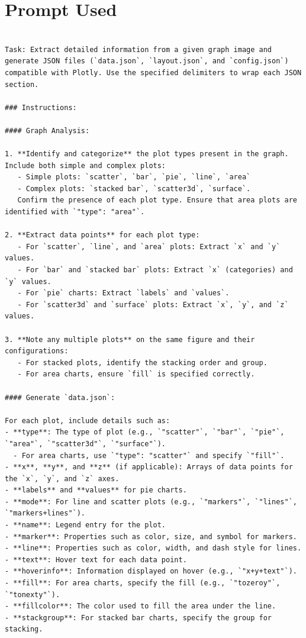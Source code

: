 \documentclass{article}
\begin{document}
\section*{Prompt Used}
\begin{verbatim}

Task: Extract detailed information from a given graph image and generate JSON files (`data.json`, `layout.json`, and `config.json`) compatible with Plotly. Use the specified delimiters to wrap each JSON section.

### Instructions:

#### Graph Analysis:

1. **Identify and categorize** the plot types present in the graph. Include both simple and complex plots:
   - Simple plots: `scatter`, `bar`, `pie`, `line`, `area`
   - Complex plots: `stacked bar`, `scatter3d`, `surface`.
   Confirm the presence of each plot type. Ensure that area plots are identified with `"type": "area"`.

2. **Extract data points** for each plot type:
   - For `scatter`, `line`, and `area` plots: Extract `x` and `y` values.
   - For `bar` and `stacked bar` plots: Extract `x` (categories) and `y` values.
   - For `pie` charts: Extract `labels` and `values`.
   - For `scatter3d` and `surface` plots: Extract `x`, `y`, and `z` values.

3. **Note any multiple plots** on the same figure and their configurations:
   - For stacked plots, identify the stacking order and group.
   - For area charts, ensure `fill` is specified correctly.

#### Generate `data.json`:

For each plot, include details such as:
- **type**: The type of plot (e.g., `"scatter"`, `"bar"`, `"pie"`, `"area"`, `"scatter3d"`, `"surface"`).
  - For area charts, use `"type": "scatter"` and specify `"fill"`.
- **x**, **y**, and **z** (if applicable): Arrays of data points for the `x`, `y`, and `z` axes.
- **labels** and **values** for pie charts.
- **mode**: For line and scatter plots (e.g., `"markers"`, `"lines"`, `"markers+lines"`).
- **name**: Legend entry for the plot.
- **marker**: Properties such as color, size, and symbol for markers.
- **line**: Properties such as color, width, and dash style for lines.
- **text**: Hover text for each data point.
- **hoverinfo**: Information displayed on hover (e.g., `"x+y+text"`).
- **fill**: For area charts, specify the fill (e.g., `"tozeroy"`, `"tonexty"`).
- **fillcolor**: The color used to fill the area under the line.
- **stackgroup**: For stacked bar charts, specify the group for stacking.


\end{verbatim}
\end{document}
